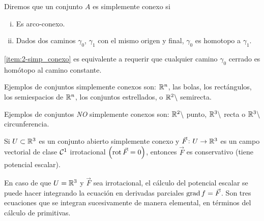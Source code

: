 \begin{defi}
    Diremos que un conjunto $A$ es simplemente conexo si
    \begin{enumerate}[i)]
        \item Es arco-conexo.
        \item\label{item:2-simp_conexo} Dados dos caminos $\gamma_0$, $\gamma_1$ con el mismo origen y final,
            $\gamma_0$ es homotopo a $\gamma_1$.
    \end{enumerate}
\end{defi}

\begin{obs*}
    \ref{item:2-simp_conexo} es equivalente a requerir que cualquier camino $\gamma_0$ cerrado es homótopo al camino
    constante.
\end{obs*}

\begin{obs}
    Ejemplos de conjuntos simplemente conexos son: $\mathbb{R}^n$, las bolas, los rectángulos, los semiespacios de $\mathbb{R}^n$,
    los conjuntos estrellados, o $\mathbb{R}^2 \setminus$ semirecta.

    Ejemplos de conjuntos \emph{NO} simplemente conexos son: $\mathbb{R}^2 \setminus$ punto, $\mathbb{R}^3 \setminus$ recta o
    $\mathbb{R}^3 \setminus$ circunferencia.
\end{obs}

\begin{prop}
    Si $U \subset \mathbb{R}^3$ es un conjunto abierto simplemente conexo y $\vec{F} \colon U \to \mathbb{R}^3$ es un campo vectorial
    de clase $\mathcal{C}^1$ irrotacional $\left( \operatorname{rot} \vec{F} = 0 \right)$, entonces $\vec{F}$ es conservativo (tiene potencial
    escalar).
\end{prop}

\begin{obs}
    En caso de que $U = \mathbb{R}^3$ y $\vec{F}$ sea irrotacional, el cálculo del potencial escalar se puede hacer integrando
    la ecuación en derivadas parciales $\operatorname{grad} f = \vec{F}$. Son tres ecuaciones que se integran sucesivamente de manera
    elemental, en términos del cálculo de primitivas.
\end{obs}


